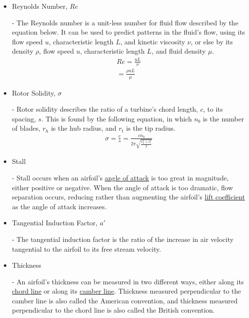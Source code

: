 \documentclass{article}
\begin{document}
\begin{itemize}
	\item \hypertarget{Re}{Reynolds Number, $Re$} - The Reynolds number is a unit-less number for fluid flow described by the equation below. It can be used to predict patterns in the fluid's flow, using its flow speed $u$, characteristic length $L$, and kinetic viscosity $\nu$, or else by its density $\rho$, flow speed $u$, characteristic length $L$, and fluid density $\mu$.
		\begin{equation} \label{eq:17}
		\begin{aligned}
        			Re = \frac{uL}{\nu} \\
			= \frac{\rho uL}{\mu} 
	    	\end{aligned}
		\end{equation}
	
	\item \hypertarget{sigma}{Rotor Solidity, $\sigma$} - Rotor solidity describes the ratio of a turbine's chord length, $c$, to its spacing, $s$. This is found by the following equation, in which $n_{b}$ is the number of blades, $r_{h}$ is the hub radius, and $r_{t}$ is the tip radius.
	\begin{equation}
	\begin{aligned}
		\sigma = \frac{c}{s} = \frac{c n_{b}}{2 \pi \sqrt{\frac{r^{2}_{h} + r^{2}_{t}}{2}}}
	\end{aligned}
	\end{equation}
	
	\item \hypertarget{ST}{Stall} - Stall occurs when an airfoil's \hyperlink{alpha}{angle of attack} is too great in magnitude, either positive or negative. When the angle of attack is too dramatic, flow separation occurs, reducing rather than augmenting the airfoil's \hyperlink{CL}{lift coefficient} as the angle of attack increases.
	
	\item \hypertarget{a'}{Tangential Induction Factor, $a'$} - The tangential induction factor is the ratio of the increase in air velocity tangential to the airfoil to its free stream velocity.
	
	\item \hypertarget{Th}{Thickness} - An airfoil's thickness can be measured in two different ways, either along its \hyperlink{c}{chord line} or along its \hyperlink{Camber}{camber line}. Thickness measured perpendicular to the camber line is also called the American convention, and thickness measured perpendicular to the chord line is also called the British convention.
	

\end{itemize}
\end{document}
